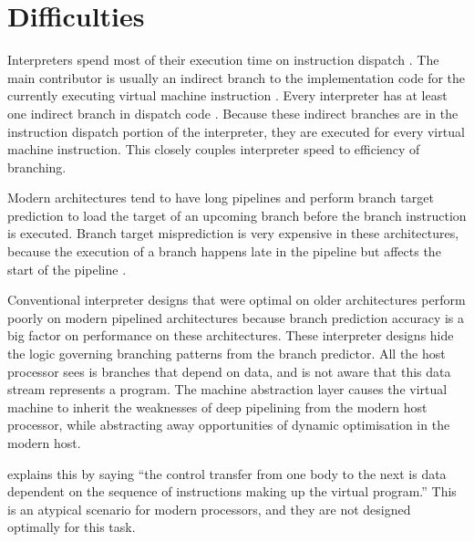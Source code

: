 	
		
	\section{Difficulties}
		Interpreters spend most of their execution time on instruction dispatch \citep{modernarchvm}. The main contributor is usually an indirect branch to the implementation code for the currently executing virtual machine instruction \citep{optimizingindirectbranch}. Every interpreter has at least one indirect branch in dispatch code \citep{modernarchvm}. Because these indirect branches are in the instruction dispatch portion of the interpreter, they are executed for every virtual machine instruction. This closely couples interpreter speed to efficiency of branching.
		
		Modern architectures tend to have long pipelines and perform branch target prediction to load the target of an upcoming branch before the branch instruction is executed. Branch target misprediction is very expensive in these architectures, because the execution of a branch happens late in the pipeline but affects the start of the pipeline \citep{optimizingindirectbranch}.
				
		Conventional interpreter designs that were optimal on older architectures perform poorly on modern pipelined architectures because branch prediction accuracy is a big factor on performance on these architectures. These interpreter designs hide the logic governing branching patterns from the branch predictor. All the host processor sees is branches that depend on data, and is not aware that this data stream represents a program. The machine abstraction layer causes the virtual machine to inherit the weaknesses of deep pipelining from the modern host processor, while abstracting away opportunities of dynamic optimisation in the modern host.
		
		\cite{yeti} explains this by saying ``the control transfer from one body to the next is data dependent on the sequence of instructions making up the virtual program.'' This is an atypical scenario for modern processors, and they are not designed optimally for this task.
		
